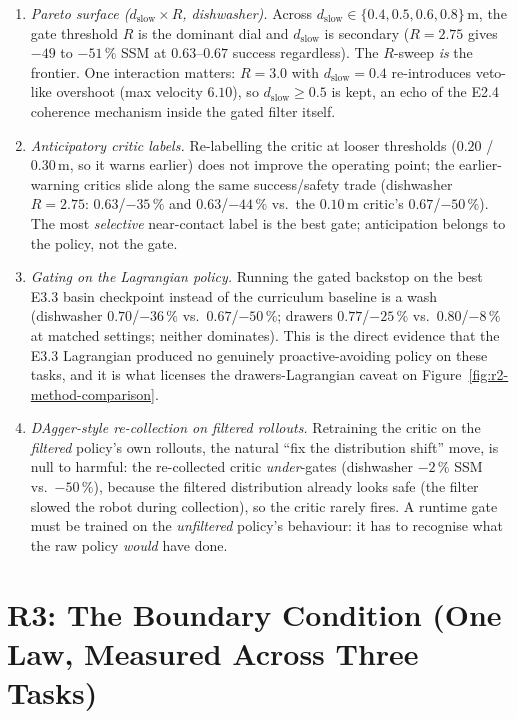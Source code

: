 \documentclass[11pt,a4paper]{report}
\newcommand{\ssm}{SSM}
\begin{document}
\begin{enumerate}[topsep=2pt,itemsep=2pt]
\item \emph{Pareto surface ($d_{\mathrm{slow}} \times R$,
  dishwasher).} Across $d_{\mathrm{slow}} \in \{0.4, 0.5, 0.6,
  0.8\}$\,m, the gate threshold $R$ is the dominant dial and
  $d_{\mathrm{slow}}$ is secondary ($R = 2.75$ gives $-49$ to
  $-51\,\%$ \ssm{} at $0.63$--$0.67$ success regardless). The
  $R$-sweep \emph{is} the frontier. One interaction matters:
  $R = 3.0$ with $d_{\mathrm{slow}} = 0.4$ re-introduces veto-like
  overshoot (max velocity $6.10$), so $d_{\mathrm{slow}} \geq 0.5$
  is kept, an echo of the E2.4 coherence mechanism inside the gated
  filter itself.
\item \emph{Anticipatory critic labels.} Re-labelling the critic at
  looser thresholds ($0.20$ / $0.30$\,m, so it warns earlier) does
  not improve the operating point; the earlier-warning critics slide
  along the same success/safety trade (dishwasher $R = 2.75$:
  $0.63$/$-35\,\%$ and $0.63$/$-44\,\%$ vs.\ the $0.10$\,m critic's
  $0.67$/$-50\,\%$). The most \emph{selective} near-contact label is
  the best gate; anticipation belongs to the policy, not the gate.
\item \emph{Gating on the Lagrangian policy.} Running the gated
  backstop on the best E3.3 basin checkpoint instead of the
  curriculum baseline is a wash (dishwasher $0.70$/$-36\,\%$ vs.\
  $0.67$/$-50\,\%$; drawers $0.77$/$-25\,\%$ vs.\ $0.80$/$-8\,\%$ at
  matched settings; neither dominates). This is the direct evidence
  that the E3.3 Lagrangian produced no genuinely
  proactive-avoiding policy on these tasks, and it is what licenses
  the drawers-Lagrangian caveat on
  Figure~\ref{fig:r2-method-comparison}.
\item \emph{DAgger-style re-collection on filtered rollouts.}
  Retraining the critic on the \emph{filtered} policy's own rollouts,
  the natural ``fix the distribution shift'' move, is null to
  harmful: the re-collected critic \emph{under}-gates (dishwasher
  $-2\,\%$ \ssm{} vs.\ $-50\,\%$), because the filtered distribution
  already looks safe (the filter slowed the robot during
  collection), so the critic rarely fires. A runtime gate must be
  trained on the \emph{unfiltered} policy's behaviour: it has to
  recognise what the raw policy \emph{would} have done.
\end{enumerate}

\section{R3: The Boundary Condition (One Law, Measured Across Three Tasks)}
\label{sec:results:boundary}
\end{document}
